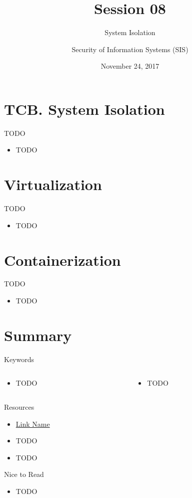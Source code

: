 \documentclass{curs}
\title[Session 08]{Session 08}
\subtitle{System Isolation}
\author{Security of Information Systems (SIS)}
\date{November 24, 2017}
\begin{document}
\frame{\titlepage}

\section{TCB. System Isolation}

\begin{frame}{TODO}
  \begin{itemize}
    \item TODO
  \end{itemize}
\end{frame}

\section{Virtualization}

\begin{frame}{TODO}
  \begin{itemize}
    \item TODO
  \end{itemize}
\end{frame}

\section{Containerization}

\begin{frame}{TODO}
  \begin{itemize}
    \item TODO
  \end{itemize}
\end{frame}

\section{Summary}

\begin{frame}{Keywords}
  \begin{columns}
    \begin{column}{0.5\textwidth}
      \begin{itemize}
        \item TODO
      \end{itemize}
    \end{column}
    \begin{column}{0.5\textwidth}
      \begin{itemize}
        \item TODO
      \end{itemize}
    \end{column}
  \end{columns}
\end{frame}

\begin{frame}{Resources}
  \begin{itemize}
    \item \href{https://link.url.com/}{Link Name}
    \item TODO
    \item TODO
  \end{itemize}
\end{frame}

\begin{frame}{Nice to Read}
  \begin{itemize}
    \item TODO
  \end{itemize}
\end{frame}
\end{document}
